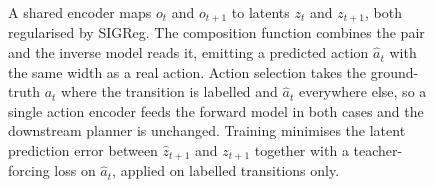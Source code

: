 \begin{figure}[t]
{%
  }
  \caption{%
           A shared encoder maps $o_t$ and $o_{t+1}$ to latents $z_t$ and
           $z_{t+1}$, both regularised by SIGReg. The composition function
           combines the pair and the inverse model reads it, emitting a
           predicted action $\hat a_t$ with the same width as a real
           action. Action selection takes the ground-truth $a_t$ where the
           transition is labelled and $\hat a_t$ everywhere else, so a
           single action encoder feeds the forward model in both cases and
           the downstream planner is unchanged. Training minimises the
           latent prediction error between $\hat z_{t+1}$ and $z_{t+1}$
           together with a teacher-forcing loss on $\hat a_t$, applied on
           labelled transitions only.}
  \label{fig:architecture}
\end{figure}
